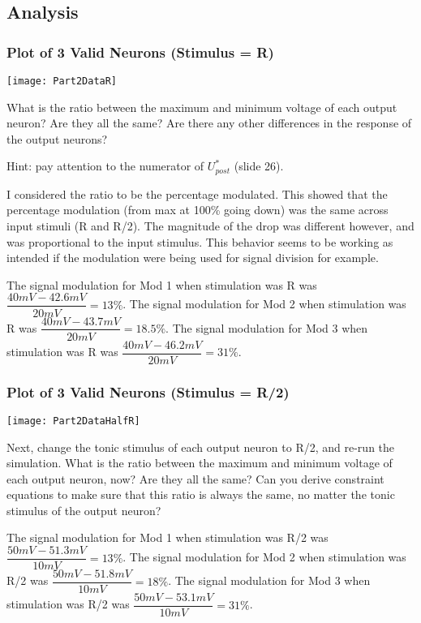 \subsection{Analysis}

\subsubsection{Plot of 3 Valid Neurons (Stimulus = R)}

\texttt{[image: Part2DataR]}

What is the ratio between the maximum and minimum voltage of each output
neuron? Are they all the same? Are there any other differences in the response
of the output neurons?

Hint: pay attention to the numerator of $U^{*}_{post}$ (slide 26).

I considered the ratio to be the percentage modulated. This showed that the percentage modulation (from max at 100\% going down) was the same across input stimuli (R and R/2). The magnitude of the drop was different however, and was proportional to the input stimulus. This behavior seems to be working as intended if the modulation were being used for signal division for example.

The signal modulation for Mod 1 when stimulation was R was $\dfrac{40 mV - 42.6 mV}{20 mV} = 13\%$.
The signal modulation for Mod 2 when stimulation was R was $\dfrac{40 mV - 43.7 mV}{20 mV} = 18.5\%$.
The signal modulation for Mod 3 when stimulation was R was $\dfrac{40 mV - 46.2 mV}{20 mV} = 31\%$.

\subsubsection{Plot of 3 Valid Neurons (Stimulus = R/2)}

\texttt{[image: Part2DataHalfR]}

Next, change the tonic stimulus of each output neuron 
to R/2, and re-run the simulation. What is the ratio between the maximum and 
minimum voltage of each output neuron, now? Are they all the same? Can you 
derive constraint equations to make sure that this ratio is always the
same, no matter the tonic stimulus of the output neuron?

The signal modulation for Mod 1 when stimulation was R/2 was $\dfrac{50 mV - 51.3 mV}{10 mV} = 13\%$.
The signal modulation for Mod 2 when stimulation was R/2 was $\dfrac{50 mV - 51.8 mV}{10 mV} = 18\%$.
The signal modulation for Mod 3 when stimulation was R/2 was $\dfrac{50 mV - 53.1 mV}{10 mV} = 31\%$.


